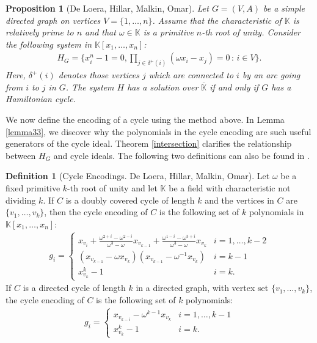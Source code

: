 \documentclass{amsart}
\renewcommand{\(}{\left(}
\renewcommand{\)}{\right)}
\newcommand{\<}{\langle}
\renewcommand{\>}{\rangle}
\renewcommand{\k}{\mathbb K}
\newcommand{\kc}{{\overline{\k}}}
\newtheorem{proposition}[theorem]{Proposition}
\theoremstyle{definition}
\newtheorem{definition}[theorem]{Definition}
\theoremstyle{remark}
\begin{document}
\begin{proposition}[De Loera, Hillar, Malkin, Omar] \label{encoding}
	Let $G = (V,A)$ be a simple directed graph on vertices $V = \{1, \ldots, n\}$. Assume that the characteristic of $\k$ is relatively prime to $n$ and that $\omega \in \k$ is a primitive $n$-th root of unity. Consider the following system in $\k[x_1, \ldots, x_n]$:
	\begin{align}
		H_G = \{x_i^n - 1 = 0, \prod_{j \in \delta^+(i)} (\omega x_i - x_j) = 0 \, : \, i \in V\}.
	\end{align}
	Here, $\delta^+(i)$ denotes those vertices $j$ which are connected to $i$ by an arc going from $i$ to $j$ in $G$. The system $H$ has a solution over $\kc$ if and only if $G$ has a Hamiltonian cycle.
\end{proposition}

We now define the encoding of a cycle using the method above. In Lemma \ref{lemma33}, we discover why the polynomials in the cycle encoding are such useful generators of the cycle ideal. Theorem \ref{intersection} clarifies the relationship between $H_G$ and cycle ideals. The following two definitions can also be found in \cite{deloera10}.

\begin{definition}[Cycle Encodings. De Loera, Hillar, Malkin, Omar] \label{cycleencoding}
	Let $\omega$ be a fixed primitive $k$-th root of unity and let $\k$ be a field with characteristic not dividing $k$. If $C$ is a doubly covered cycle of length $k$ and the vertices in $C$ are $\{v_1, \ldots, v_k\}$, then the cycle encoding of $C$ is the following set of $k$ polynomials in $\k[x_1,\ldots,x_n]$:
	\begin{align} \label{eq:dccycle}
		g_i = \left \{
			\begin{array}{ll}
			x_{v_i} + \frac{\omega^{2+i}-\omega^{2-i}}{\omega^3-\omega} x_{v_{k-1}} + \frac{\omega^{1-i}-\omega^{3+i}}{\omega^3-\omega} x_{v_k} & i = 1,\ldots, k-2\\
			(x_{v_{k-1}}-\omega x_{v_k})(x_{v_{k-1}}-\omega^{-1}x_{v_k}) & i = k-1\\
			x_{v_k}^k - 1 & i = k.
			\end{array} \right .
	\end{align}
	If $C$ is a directed cycle of length $k$ in a directed graph, with vertex set $\{v_1,\ldots,v_k\}$, the cycle encoding of $C$ is the following set of $k$ polynomials:
	\begin{align} \label{eq:sccycle}
		g_i = \left \{
			\begin{array}{ll}
			x_{v_{k-i}} - \omega^{k-1} x_{v_k} & i = 1,\ldots,k-1\\
			x_{v_k}^k - 1 & i = k.
			\end{array} \right .
	\end{align}
\end{definition}
\end{document}
